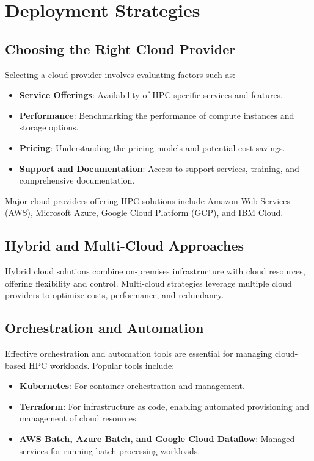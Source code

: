 \section{Deployment Strategies}

\subsection{Choosing the Right Cloud Provider}

Selecting a cloud provider involves evaluating factors such as:

\begin{itemize}
    \item \textbf{Service Offerings}: Availability of HPC-specific services and features.
    \item \textbf{Performance}: Benchmarking the performance of compute instances and storage options.
    \item \textbf{Pricing}: Understanding the pricing models and potential cost savings.
    \item \textbf{Support and Documentation}: Access to support services, training, and comprehensive documentation.
\end{itemize}

Major cloud providers offering HPC solutions include Amazon Web Services (AWS), Microsoft Azure, Google Cloud Platform (GCP), and IBM Cloud.

\subsection{Hybrid and Multi-Cloud Approaches}

Hybrid cloud solutions combine on-premises infrastructure with cloud resources, offering flexibility and control. Multi-cloud strategies leverage multiple cloud providers to optimize costs, performance, and redundancy.

\subsection{Orchestration and Automation}

Effective orchestration and automation tools are essential for managing cloud-based HPC workloads. Popular tools include:

\begin{itemize}
    \item \textbf{Kubernetes}: For container orchestration and management.
    \item \textbf{Terraform}: For infrastructure as code, enabling automated provisioning and management of cloud resources.
    \item \textbf{AWS Batch, Azure Batch, and Google Cloud Dataflow}: Managed services for running batch processing workloads.
\end{itemize}

